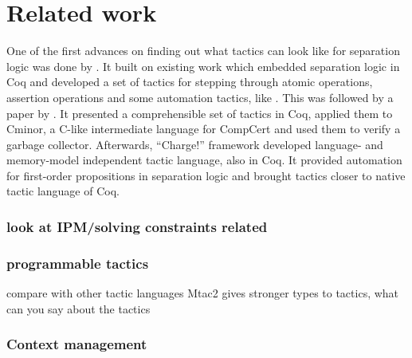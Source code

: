 \chapter{Related work}
\label{cha:related-work}

One of the first advances on finding out what tactics can look like for separation logic was done by \citet{appel2006tactics}.
It built on existing work which embedded separation logic in Coq and developed a set of tactics for stepping through atomic operations, assertion operations and some automation tactics, like .
This was followed by a paper by \citet{mccreightPracticalTacticsSeparation2009}.
It presented a comprehensible set of tactics in Coq, applied them to Cminor, a C-like intermediate language for CompCert and used them to verify a garbage collector.
Afterwards, ``Charge!'' framework \cite{bengtsonCharge2012} developed language- and memory-model independent tactic language, also in Coq.
It provided automation for first-order propositions in separation logic and brought tactics closer to native tactic language of Coq.

\subsection{look at IPM/solving constraints related}

\subsection{programmable tactics}

compare with other tactic languages
Mtac2 gives stronger types to tactics, what can you say about the tactics

\subsection{Context management}
\label{sec:context-management}

